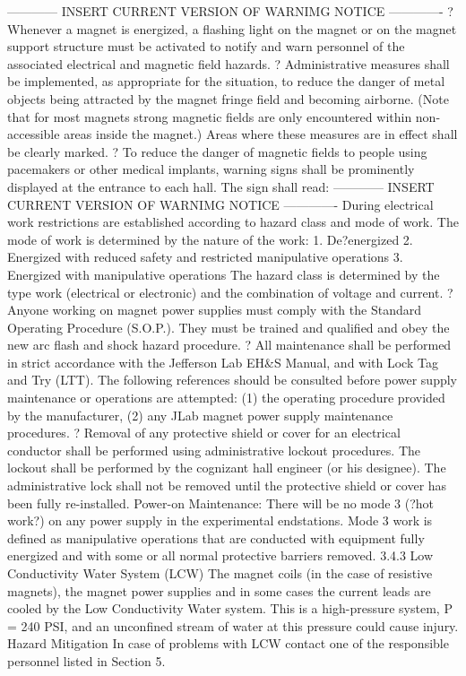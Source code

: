 {{{    ------------ INSERT  CURRENT VERSION OF WARNIMG NOTICE  -------------
	? 	Whenever a magnet is energized, a flashing light on the magnet or on the magnet support structure must be activated to notify and warn personnel of the associated electrical and magnetic field hazards.
	? 	Administrative measures shall be implemented, as appropriate for the situation, to reduce the danger of metal objects being attracted by the magnet fringe field and becoming airborne. (Note that for most magnets strong magnetic fields are only encountered within non-accessible areas inside the magnet.) Areas where these measures are in effect shall be clearly marked.
	? 	To reduce the danger of magnetic fields to people using pacemakers or other medical implants, warning signs shall be prominently displayed at the entrance to each hall. The sign shall read:
    ------------ INSERT  CURRENT VERSION OF WARNIMG NOTICE  -------------
	During electrical work restrictions are established according to hazard class and mode of work. The mode of work is determined by the nature of the work:
	1. 	De?energized
	2. 	Energized with reduced safety and restricted manipulative operations
	3. 	Energized with manipulative operations
The hazard class is determined by the type work (electrical or electronic) and the combination of voltage and current.
	? 	Anyone working on magnet power supplies must comply with the Standard Operating Procedure (S.O.P.). They must be trained and qualified and obey the new arc flash and shock hazard procedure.
	? 	All maintenance shall be performed in strict accordance with the Jefferson Lab EH\&S Manual, and with Lock Tag and Try (LTT). The following references should be consulted before power supply maintenance or operations are attempted: (1) the operating procedure provided by the manufacturer, (2) any JLab magnet power supply maintenance procedures.
	? 	Removal of any protective shield or cover for an electrical conductor shall be performed using administrative lockout procedures. The lockout shall be performed by the cognizant hall engineer (or his designee). The administrative lock shall not be removed until the protective shield or cover has been fully re-installed.
	Power-on Maintenance: There will be no mode 3 (?hot work?) on any power supply in the experimental endstations. Mode 3 work is defined as manipulative operations that are conducted with equipment fully energized and with some or all normal protective barriers removed.
3.4.3		Low Conductivity Water System (LCW)
	The magnet coils (in the case of resistive magnets), the magnet power supplies and in some cases the current leads are cooled by the Low Conductivity Water system. This is a high-pressure system, P = 240 PSI, and an unconfined stream of water at this pressure could cause injury.
Hazard Mitigation	
	In case of problems with LCW contact one of the responsible personnel listed in Section 5.

}}}
